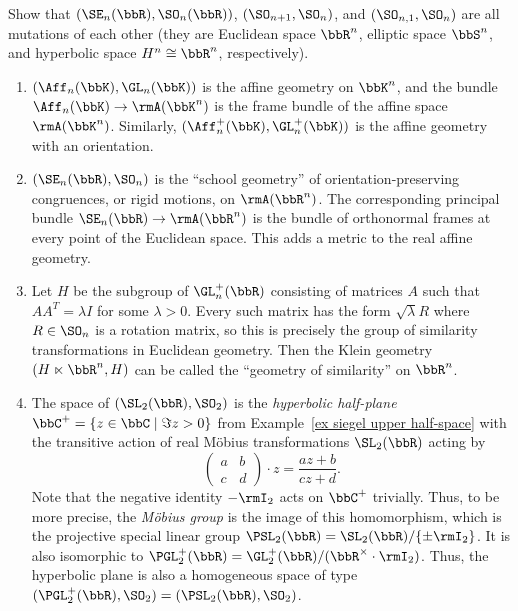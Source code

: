 \begin{xca}
    Show that $(\SE_n(\bbR),\SO_n(\bbR))$, $(\SO_{n+1},\SO_n)$, and $(\SO_{n,1},\SO_n)$ are all mutations of each other (they are Euclidean space $\bbR^n$, elliptic space $\bbS^n$, and hyperbolic space $H^n\cong\bbR^n$, respectively).
\end{xca}




\begin{example}
    \begin{enumerate}
        \item $(\Aff_n(\bbK), \GL_n(\bbK))$ is the affine geometry on $\bbK^n$, and the bundle $\Aff_n(\bbK)\to \rmA(\bbK^n)$ is the frame bundle of the affine space $\rmA(\bbK^n)$. Similarly, $(\Aff_n^+(\bbK), \GL_n^+(\bbK))$ is the affine geometry with an orientation.

        \item $(\SE_n(\bbR),\SO_n)$ is the ``school geometry'' of orientation-preserving congruences, or rigid motions, on $\rmA(\bbR^n)$. The corresponding principal bundle $\SE_n(\bbR)\to \rmA(\bbR^n)$ is the bundle of orthonormal frames at every point of the Euclidean space. This adds a metric to the real affine geometry.

        \item Let $H$ be the subgroup of $\GL_n^+(\bbR)$ consisting of matrices $A$ such that $AA^T=\lambda I$ for some $\lambda>0$. Every such matrix has the form $\sqrt{\lambda}R$ where $R\in\SO_n$ is a rotation matrix, so this is precisely the group of similarity transformations in Euclidean geometry. Then the Klein geometry $(H\ltimes \bbR^n,H)$ can be called the ``geometry of similarity'' on $\bbR^n$.
        
        \item The space of $(\SL_2(\bbR),\SO_2)$ is the \emph{hyperbolic half-plane} $\bbC^+=\{z\in \bbC\mid \Im z>0\}$ from Example~\ref{ex siegel upper half-space} with the transitive action of real M\"obius transformations $\SL_2(\bbR)$ acting by 
        \[\begin{pmatrix}
            a&b\\c&d
        \end{pmatrix}\cdot z=\frac{az+b}{cz+d}.\]
        Note that the negative identity $-\rmI_2$ acts on $\bbC^+$ trivially. Thus, to be more precise, the \emph{M\"obius group} is the image of this homomorphism, which is the projective special linear group $\PSL_2(\bbR)=\SL_2(\bbR)\slash \{\pm \rmI_2\}$. It is also isomorphic to $\PGL^+_2(\bbR)=\GL^+_2(\bbR)\slash (\bbR^\times\cdot \rmI_2)$. Thus, the hyperbolic plane is also a homogeneous space of type $(\PGL^+_2(\bbR),\SO_2)=(\PSL_2(\bbR),\SO_2)$.


\end{enumerate}
\end{example}
